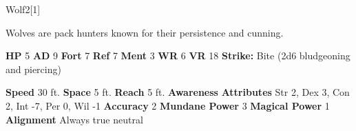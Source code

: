   
  \begin{monsection}{Wolf}{2}[1]
    \vspace{-1em}\vspace{-1em}
    \vspace{0em}

    
      Wolves are pack hunters known for their persistence and cunning.
    
    

    \begin{spellcontent}
      \begin{spelltargetinginfo}
        \pari \textbf{HP} 5 \monsep
          \textbf{AD} 9 \monsep
          \textbf{Fort} 7 \monsep
          \textbf{Ref} 7 \monsep
          \textbf{Ment} 3
        \pari \textbf{WR} 6 \monsep
        \textbf{VR} 18
        \pari \textbf{Strike:}
            Bite  (2d6 bludgeoning and piercing)
      \end{spelltargetinginfo}
    \end{spellcontent}
    \begin{monsterfooter}
      \pari \textbf{Speed} 30 ft. \monsep
        \textbf{Space} 5 ft. \monsep
        \textbf{Reach} 5 ft.
      \pari \textbf{Awareness} 
      \pari \textbf{Attributes}
        Str 2, Dex 3,
        Con 2, Int -7,
        Per 0, Wil -1
      \pari \textbf{Accuracy} 2 \monsep
        \textbf{Mundane Power} 3 \monsep
      \textbf{Magical Power} 1
      \pari \textbf{Alignment} Always true neutral
    \end{monsterfooter}
  \end{monsection}
  
